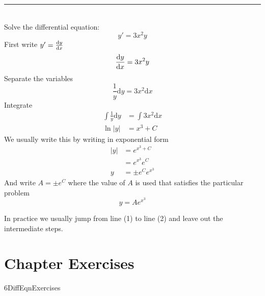 \rule{6.8cm}{0.5pt}\\
\example Solve the differential equation: \[y'=3x^2 y\] 
\solution First write $y^{ \prime } =\frac{\mathrm{d}y}{\mathrm{d}x}$ 
\begin{equation*}\frac{\mathrm{d}y}{\mathrm{d}x} =3 x^{2} y
\end{equation*}Separate the variables
\begin{equation*}\frac{1}{y} \mathrm{d} y =3 x^{2} \mathrm{d} x
\end{equation*}Integrate
\begin{align}\int \frac{1}{y} \mathrm{d} y &    = \int 3 x^{2} \mathrm{d} x \nonumber  \\
\ln  \left \vert y\right \vert  &    = x^{3} +C \tag{1}\end{align}We usually write this by writing in exponential form
\begin{align*}\left \vert y\right \vert  &    = e^{x^{3} +C} \\
 &    = e^{x^{3}} e^{C} \\
y &    =  \pm e^{C} e^{x^{3}}\end{align*}And write $A = \pm e^{C}$ where the value of $A$ is used that satisfies the particular problem
\begin{equation}y =A e^{x^{3}}\tag{2}
\end{equation}

In practice we usually jump from line (1) to line (2) and leave out the intermediate steps. 

\section{Chapter Exercises}
{6DiffEqnExercises}

